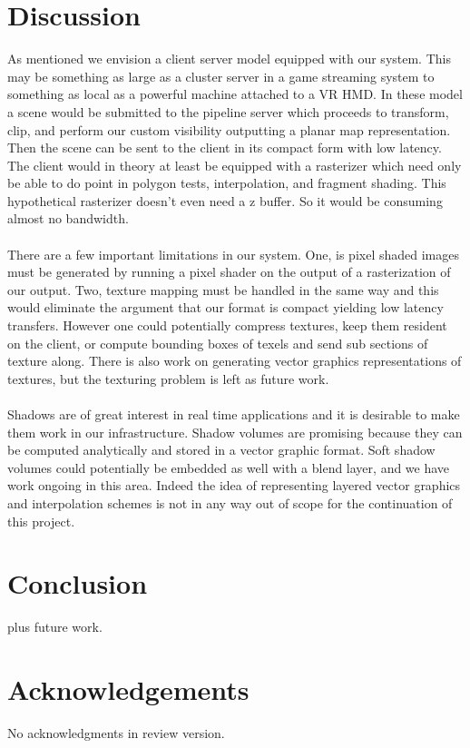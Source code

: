 \documentclass[review]{acmsiggraph}
\begin{document}
\section{Discussion}
As mentioned we envision a client server model equipped with our system. This may be something as large as a cluster server in a game streaming system to something as local as a powerful machine attached to a VR HMD. In these model a scene would be submitted to the pipeline server which proceeds to transform, clip, and perform our custom visibility outputting a planar map representation. Then the scene can be sent to the client in its compact form with low latency. The client would in theory at least be equipped with a rasterizer which need only be able to do point in polygon tests, interpolation, and fragment shading. This hypothetical rasterizer doesn’t even need a z buffer. So it would be consuming almost no bandwidth. 
\\\\
There are a few important limitations in our system. One, is pixel shaded images must be generated by running a pixel shader on the output of a rasterization of our output. Two, texture mapping must be handled in the same way and this would eliminate the argument that our format is compact yielding low latency transfers. However one could potentially compress textures, keep them resident on the client, or compute bounding boxes of texels and send sub sections of texture along. There is also work on generating vector graphics representations of textures, but the texturing problem is left as future work.
\\\\
Shadows are of great interest in real time applications and it is desirable to make them work in our infrastructure. Shadow volumes are promising because they can be computed analytically and stored in a vector graphic format. Soft shadow volumes could potentially be embedded as well with a blend layer, and we have work ongoing in this area. Indeed the idea of representing layered vector graphics and interpolation schemes is not in any way out of scope for the continuation of this project.

\section{Conclusion}
plus future work.

\section*{Acknowledgements}

No acknowledgments in review version.


\nocite{*}

\end{document}
